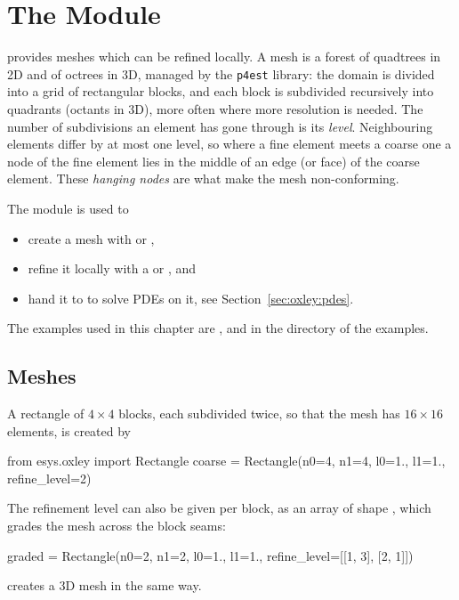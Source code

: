 
%
%
%

\chapter{The \oxley Module}\label{chap:oxley}

\oxley provides meshes which can be refined locally. A mesh is a forest of
quadtrees in 2D and of octrees in 3D, managed by the \texttt{p4est}
library: the domain is divided into a grid of rectangular blocks,
and each block is subdivided recursively into quadrants (octants in 3D), more
often where more resolution is needed. The number of subdivisions an element
has gone through is its \emph{level}. Neighbouring elements differ by at most
one level, so where a fine element meets a coarse one a node of the fine
element lies in the middle of an edge (or face) of the coarse element. These
\emph{hanging nodes} are what make the mesh
non-conforming.

The \oxley module is used to
\begin{itemize}
\item create a mesh with  or ,
\item refine it locally with a  or
, and
\item hand it to \finley to solve PDEs on it, see
Section~\ref{sec:oxley:pdes}.
\end{itemize}
The examples used in this chapter are ,
 and  in the
 directory of the examples.

\section{Meshes}
A rectangle of $4 \times 4$ blocks, each subdivided twice, so that the mesh
has $16 \times 16$ elements, is created by
\begin{python}
from esys.oxley import Rectangle
coarse = Rectangle(n0=4, n1=4, l0=1., l1=1., refine_level=2)
\end{python}
The refinement level can also be given per block, as an array of shape
, which grades the mesh across the block seams:
\begin{python}
graded = Rectangle(n0=2, n1=2, l0=1., l1=1., refine_level=[[1, 3], [2, 1]])
\end{python}
 creates a 3D mesh in the same way.


